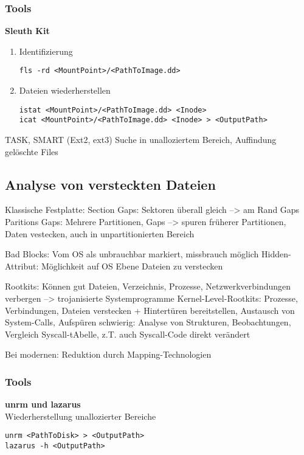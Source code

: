 \subsubsection{Tools}
\textbf{Sleuth Kit}\\
\begin{enumerate}
\item Identifizierung
\begin{verbatim}
fls -rd <MountPoint>/<PathToImage.dd>
\end{verbatim}
\item Dateien wiederherstellen
\begin{verbatim}
istat <MountPoint>/<PathToImage.dd> <Inode>
icat <MountPoint>/<PathToImage.dd> <Inode> > <OutputPath>
\end{verbatim}
\end{enumerate}


TASK, 
SMART (Ext2, ext3) Suche in unalloziertem Bereich, Auffindung gelöschte Files

\subsection{Analyse von versteckten Dateien}
Klassische Festplatte:
Section Gaps: Sektoren überall gleich --> am Rand Gaps
Paritions Gaps: Mehrere Partitionen, Gaps --> spuren früherer Partitionen, Daten vestecken, auch in unpartitionierten Bereich

Bad Blocks: Vom OS als unbrauchbar markiert, missbrauch möglich
Hidden-Attribut: Möglichkeit auf OS Ebene Dateien zu verstecken


Rootkits: Können gut Dateien, Verzeichnis, Prozesse, Netzwerkverbindungen verbergen --> trojanisierte Systemprogramme
Kernel-Level-Rootkits: Prozesse, Verbindungen, Dateien verstecken + Hintertüren bereitstellen, Austausch von System-Calls, Aufspüren schwierig: Analyse von Strukturen, Beobachtungen, Vergleich Syscall-tAbelle, z.T. auch Syscall-Code direkt verändert

Bei modernen: Reduktion durch Mapping-Technologien

\subsubsection{Tools}
\textbf{unrm und lazarus} \\
Wiederherstellung unallozierter Bereiche
\begin{verbatim}
unrm <PathToDisk> > <OutputPath>
lazarus -h <OutputPath>
\end{verbatim}


